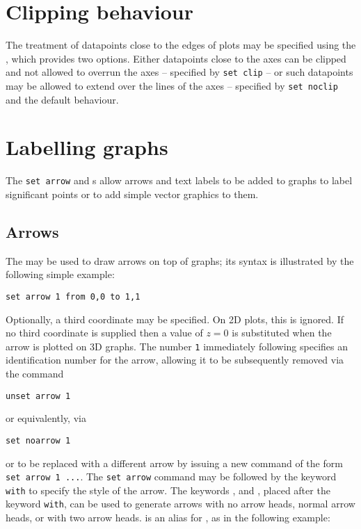 \section{Clipping behaviour}

The treatment of datapoints close to the edges of plots may be specified using
the , which provides two options. Either datapoints close to
the axes can be clipped and not allowed to overrun the axes -- specified by
{\tt set clip} -- or such datapoints may be allowed to extend over the lines of
the axes -- specified by {\tt set noclip} and the default behaviour.

\section{Labelling graphs}

The {\tt set arrow} and s allow arrows and
text labels to be added to graphs to label significant points or to add simple
vector graphics to them.

\subsection{Arrows}

\label{sec:set_arrow} The  may be used to
draw arrows on top of graphs; its syntax is illustrated by the following simple
example:

\begin{verbatim}
set arrow 1 from 0,0 to 1,1
\end{verbatim}

\noindent Optionally, a third coordinate may be specified. On 2D plots, this is
ignored. If no third coordinate is supplied then a value of $z=0$ is
substituted when the arrow is plotted on 3D graphs. The number {\tt 1}
immediately following  specifies an identification number
for the arrow, allowing it to be subsequently removed via the command

\begin{verbatim}
unset arrow 1
\end{verbatim}

\noindent or equivalently, via

\begin{verbatim}
set noarrow 1
\end{verbatim}

\noindent or to be replaced with a different arrow by issuing a new command of
the form {\tt set arrow 1~...}.  The {\tt set arrow} command may be followed by
the keyword {\tt with} to specify the style of the arrow. The keywords
,  and , placed after the
keyword {\tt with}, can be used to generate arrows with no arrow heads, normal
arrow heads, or with two arrow heads.   is an alias for
, as in the following example:


